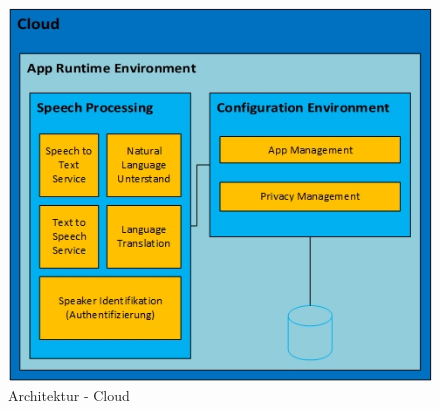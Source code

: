 \begin{figure}[h!]
	\centering
	\includegraphics[width=0.9\linewidth]{Picture/Infrastruktur-Cloud.jpg}
	\caption[Architektur - Mobile App]{Architektur - Cloud}
	\label{fig:infrastruktur-cloud}
\end{figure}

